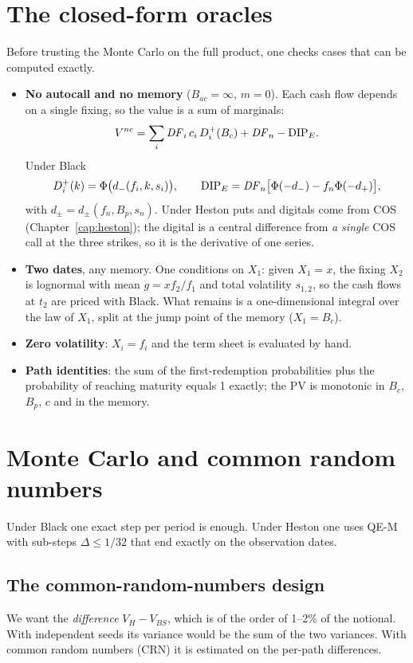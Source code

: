 \section{The closed-form oracles}
Before trusting the Monte Carlo on the full product, one checks cases that can be computed exactly.
\begin{itemize}
\item \textbf{No autocall and no memory} ($B_{ac}=\infty$, $m=0$). Each cash flow depends on a single fixing, so the
value is a sum of marginals:
\begin{equation}\label{eq:ac-nocall}
V^{nc}=\sum_i\mathit{DF}_i\,c_i\,D_i^+(B_c)+\mathit{DF}_n-\mathrm{DIP}_E .
\end{equation}
Under Black
\[
D_i^+(k)=\Phi\big(d_-(f_i,k,s_i)\big),\qquad\mathrm{DIP}_E=\mathit{DF}_n\big[\Phi(-d_-)-f_n\Phi(-d_+)\big],
\]
with $d_\pm=d_\pm(f_n,B_p,s_n)$. Under Heston puts and digitals come from COS (Chapter~\ref{cap:heston}); the digital
is a central difference from \emph{a single} COS call at the three strikes, so it is the derivative of one series.
\item \textbf{Two dates}, any memory. One conditions on $X_1$: given $X_1=x$, the fixing $X_2$ is lognormal with mean
$g=xf_2/f_1$ and total volatility $s_{1,2}$, so the cash flows at $t_2$ are priced with Black. What remains is a
one-dimensional integral over the law of $X_1$, split at the jump point of the memory ($X_1=B_c$).
\item \textbf{Zero volatility}: $X_i=f_i$ and the term sheet is evaluated by hand.
\item \textbf{Path identities}: the sum of the first-redemption probabilities plus the probability of reaching
maturity equals 1 exactly; the PV is monotonic in $B_c$, $B_p$, $c$ and in the memory.
\end{itemize}

\section{Monte Carlo and common random numbers}
Under Black one exact step per period is enough. Under Heston one uses QE-M with sub-steps $\Delta\le1/32$ that end
exactly on the observation dates.

\subsection{The common-random-numbers design}
We want the \emph{difference} $V_H-V_{BS}$, which is of the order of 1--2\% of the notional. With independent seeds
its variance would be the sum of the two variances. With common random numbers (CRN) it is estimated on the per-path
differences.

